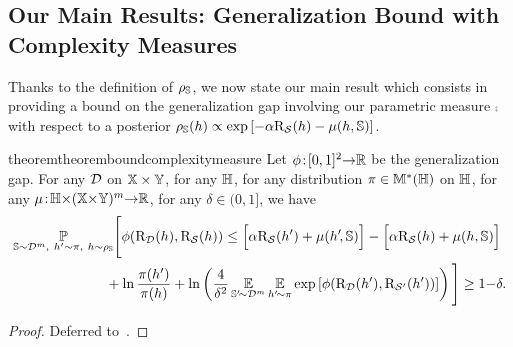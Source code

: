\subsection{Our Main Results: Generalization Bound with Complexity Measures}
\label{chap:dis-mu:sec:result}

Thanks to the definition of $\rho_{\mathbb{S}}$, we now state our main result which consists in providing a bound on the generalization gap involving our parametric measure $\comp$ with respect to a posterior $\rho_{\mathbb{S}}(h) \propto \exp\left[-\alpha\text{R}_{\mathcal{S}}(h)-\operatorname{\mu}(h, \mathbb{S})\right]$.

\begin{restatable}{theorem}{theoremboundcomplexitymeasure} \label{chap:dis-mu:theorem:disintegrated-comp}
Let $\phi\!:\! [0,1]^2{\to}\mathbb{R}$ be the generalization gap.
For any $\mathcal{D}$ on $\mathbb{X}\times\mathbb{Y}$, for any $\mathbb{H}$, for any distribution $\pi\in\mathbb{M}^{*}(\mathbb{H})$ on $\mathbb{H}$, for any $\operatorname{\mu}\!:\! \mathbb{H}{\times}(\mathbb{X}{\times}\mathbb{Y})^m{\to}\mathbb{R}$, for any $\delta\!\in\!(0, 1]$, we have
\begin{align*}
    \PP_{\S\sim\D^\m,\ \h'\sim\P,\ \h\sim\AQ}&\Bigg[ \phi(\Risk_{\D}(\h), \Risk_{\dS}(\h)) \le \Big[\alpha\Risk_{\dS}(\h{'})  + \comp(\h'\!,\S)\Big] - \Big[\alpha\Risk_{\dS}(\h)+\comp(\h,\S)\Big]\\
    &\hspace{-0.2cm}+\ln\frac{\P(\h')}{\P(\h)} + \ln\left( \frac{4}{\delta^2} \EE_{\S'\!{\sim}\D^\m}\EE_{\h'\!{\sim}\P} \exp\left[\phi(\Risk_{\D}(\h{'}),\Risk_{\dS'}(\h'))\right]\right) \Bigg] \ge 1{-}\delta.
\end{align*}
\end{restatable}
\begin{noaddcontents}\begin{proof}
Deferred to~.
\end{proof}\end{noaddcontents}

